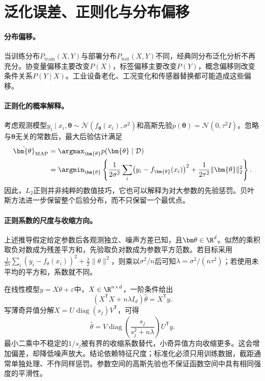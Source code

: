 \section{泛化误差、正则化与分布偏移}
\paragraph{分布偏移。}
当训练分布$P_{\mathrm{train}}(X,Y)$与部署分布$P_{\mathrm{test}}(X,Y)$不同，经典同分布泛化分析不再充分。协变量偏移主要改变$P(X)$，标签偏移主要改变$P(Y)$，概念偏移则改变条件关系$P(Y\mid X)$。工业设备老化、工况变化和传感器替换都可能造成这些偏移。

\paragraph{正则化的概率解释。}
考虑观测模型$y_i\mid x_i,\bm{\theta}\sim\mathcal{N}(f_{\bm{\theta}}(x_i),\sigma^2)$和高斯先验$p(\bm{\theta})=\mathcal{N}(0,\tau^2I)$。忽略与$\bm{\theta}$无关的常数后，最大后验估计满足
\begin{align}
 \hat{\bm{\theta}}_{\mathrm{MAP}}
 &=\argmax_{\bm{\theta}}p(\bm{\theta}\mid\mathcal{D})\\
 &=\argmin_{\bm{\theta}}\left\{\frac{1}{2\sigma^2}\sum_i\bigl(y_i-f_{\bm{\theta}}(x_i)\bigr)^2+\frac{1}{2\tau^2}\|\bm{\theta}\|_2^2\right\}.
\end{align}
因此，$L_2$正则并非纯粹的数值技巧，它也可以解释为对大参数的先验惩罚。贝叶斯方法进一步保留整个后验分布，而不只保留一个最优点。

\paragraph{正则系数的尺度与收缩方向。}
上述推导假定给定参数后各观测独立、噪声方差已知，且$\bm\theta\in\R^d$。似然的乘积取负对数成为残差平方和，先验取负对数成为参数平方范数。若目标采用$\frac1{2n}\sum_i(y_i-f_\theta(x_i))^2+\frac\lambda2\|\theta\|^2$，则乘以$\sigma^2/n$后可知$\lambda=\sigma^2/(n\tau^2)$；若使用未平均的平方和，系数就不同。

在线性模型$y=X\theta+\varepsilon$中，$X\in\R^{n\times d}$，一阶条件给出
\begin{equation}
 (X^{\mathsf T}X+n\lambda I_d)\hat\theta=X^{\mathsf T}y.
\end{equation}
写薄奇异值分解$X=U\operatorname{diag}(s_j)V^{\mathsf T}$，可得
\begin{equation}
 \hat\theta=V\operatorname{diag}\left(\frac{s_j}{s_j^2+n\lambda}\right)U^{\mathsf T}y.
\end{equation}
最小二乘中不稳定的$1/s_j$被有界的收缩系数替代，小奇异值方向收缩更多。这会增加偏差，却降低噪声放大。结论依赖特征尺度；标准化必须只用训练数据，截距通常单独处理、不作同样惩罚。参数空间的高斯先验也不保证函数空间中具有相同强度的平滑性。


